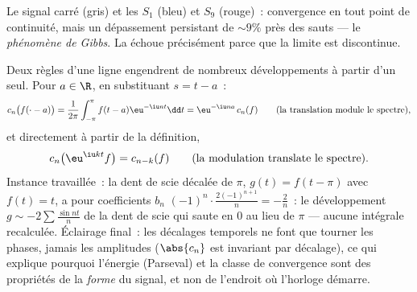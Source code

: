 \begin{omfigure}

{\small Le signal carré (gris) et les 
$S_1$ (bleu) et $S_9$ (rouge)~: convergence en tout point de
continuité, mais un dépassement persistant de $\sim 9\%$ près des
sauts --- le \emph{phénomène de Gibbs}. La
 échoue précisément parce que la limite est
discontinue.}
\end{omfigure}

\begin{example}\label{ex:b2:fourier:shiftrules}
Deux règles d'une ligne engendrent de nombreux développements à
partir d'un seul. Pour $a \in \R$, en substituant $s = t - a$~:
\[
c_n\bigl(f(\cdot - a)\bigr)
= \frac{1}{2\pi}\int_{-\pi}^{\pi}f(t - a)\eu^{-\iu nt}\dd t
= \eu^{-\iu na}\,c_n(f)
\qquad\text{(la translation module le spectre)},
\]
et directement à partir de la définition,
\[
c_n\bigl(\eu^{\iu kt}f\bigr) = c_{n-k}(f)
\qquad\text{(la modulation translate le spectre)}.
\]
Instance travaillée~: la dent de scie décalée de $\pi$, $g(t) = f(t
- \pi)$ avec $f(t) = t$, a pour coefficients $b_n$
$(-1)^n\cdot\frac{2(-1)^{n+1}}{n} = -\frac2n$~: le développement $g
\sim -2\sum\frac{\sin nt}{n}$ de la dent de scie qui saute en $0$ au
lieu de $\pi$ --- aucune intégrale recalculée. Éclairage final~: les
décalages temporels ne font que tourner les phases, jamais les
amplitudes ($\abs{c_n}$ est invariant par décalage), ce qui explique
pourquoi l'énergie (Parseval) et la classe de convergence sont des
propriétés de la \emph{forme} du signal, et non de l'endroit où
l'horloge démarre.
\end{example}

